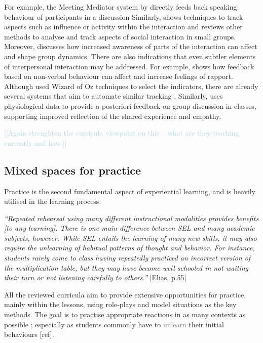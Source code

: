 \documentclass[prodmode,acmtochi]{acmsmall}
\newcommand{\todo}[1]{\textrm{\textrm{\textcolor{LightBlue}{[[#1]]} } } }
\newcommand{\rephrase}[1]{\textrm{\textrm{\textcolor{gray}{#1}}}}
\newcommand{\qq}[2]{\textrm{\textit{``#2''}}{ [#1]}}
\begin{document}
For example, the Meeting Mediator system by  directly feeds back speaking behaviour of participants in a discussion  Similarly,  shows techniques to track aspects such as influence or activity within the interaction and  reviews other methods to analyse and track aspects of social interaction in small groups. Moreover,  discusses how increased awareness of parts of the interaction can affect and shape group dynamics. 
There are also indications that even subtler elements of interpersonal interaction may be addressed. For example,  shows how feedback based on non-verbal behaviour can affect and increase feelings of rapport. Although  used Wizard of Oz techniques to select the indicators, there are already several systems that aim to automate similar tracking \cite{Sun2011,Hagad2011}. Similarly,  uses physiological data to provide a posteriori feedback on group discussion in classes, supporting improved reflection of the shared experience and empathy. 

\todo{Again strenghten the curricula viewpoint on this -- what are they teaching currently and how.}





\subsection{Mixed spaces for practice}
\label{sec:mixedSpaces}

Practice is the second fundamental aspect of experiential learning, and is heavily utilised in the learning process. 

\qq{Elias, p.55}{Repeated rehearsal using many different instructional modalities provides benefits [to any learning]. There is one main difference between SEL and many academic subjects, however. While SEL entails the learning of many new skills, it may also require the unlearning of habitual patterns of thought and behavior. For instance, students rarely come to class having repeatedly practiced an incorrect version of the multiplication table, but they may have become well schooled in not waiting their turn or not listening carefully to others.}





All the reviewed curricula aim to provide extensive opportunities for practice, mainly within the lessons, using role-plays and model situations as the key methods. The goal is to practise appropriate reactions in as many contexts as possible \cite{ref,ref}; especially as students commonly have to \rephrase{unlearn} their initial behaviours [ref]. 
\end{document}
